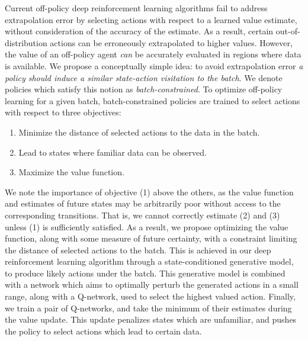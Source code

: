 \documentclass{article}
\begin{document}
Current off-policy deep reinforcement learning algorithms fail to address extrapolation error by selecting actions with respect to a learned value estimate, without consideration of the accuracy of the estimate. As a result, certain out-of-distribution actions can be erroneously extrapolated to higher values. However, the value of an off-policy agent \textit{can} be accurately evaluated in regions where data is available. We propose a conceptually simple idea: to avoid extrapolation error \textit{a policy should induce a similar state-action visitation to the batch}. We denote policies which satisfy this notion as \textit{batch-constrained}. To optimize off-policy learning for a given batch, batch-constrained policies are trained to select actions with respect to three objectives:
\begin{enumerate}[topsep=0pt, nosep, label=(\arabic*)]
\item Minimize the distance of selected actions to the data in the batch.
\item Lead to states where familiar data can be observed.
\item Maximize the value function.
\end{enumerate}
We note the importance of objective (1) above the others, as the value function and estimates of future states may be arbitrarily poor without access to the corresponding transitions. That is, we cannot correctly estimate (2) and (3) unless (1) is sufficiently satisfied. 
As a result, we propose optimizing the value function, along with some measure of future certainty, with a constraint limiting the distance of selected actions to the batch. This is achieved in our deep reinforcement learning algorithm through a state-conditioned generative model, to produce likely actions under the batch. This generative model is combined with a network which aims to optimally perturb the generated actions in a small range, along with a Q-network, used to select the highest valued action. Finally, we train a pair of Q-networks, and take the minimum of their estimates during the value update. This update penalizes states which are unfamiliar, and pushes the policy to select actions which lead to certain data. 

\end{document}
